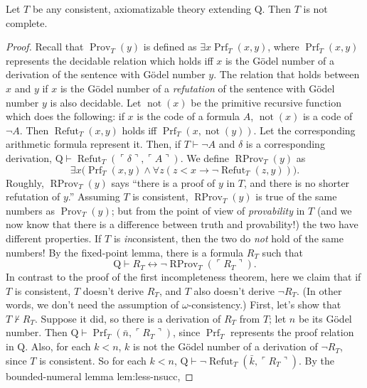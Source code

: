 \begin{theorem}
Let $T$ be any consistent, axiomatizable theory extending $\mathrm Q$. Then $T$ is not complete.
\end{theorem}
\begin{proof}
Recall that $\operatorname{Prov}_T(y)$ is defined as $\exists x\operatorname{Prf}_T(x,y)$, where $\operatorname{Prf}_T(x,y)$ represents the decidable relation which holds iff $x$ is the G\"odel number of a derivation of the sentence with G\"odel number $y$. The relation that holds between $x$ and $y$ if $x$ is the G\"odel number of a \emph{refutation} of the sentence with G\"odel number $y$ is also decidable. Let $\operatorname{not}(x)$ be the primitive recursive function which does the following: if $x$ is the code of a formula $A$, $\operatorname{not}(x)$ is a code of $\neg A$. Then $\operatorname{Refut}_T(x,y)$ holds iff $\operatorname{Prf}_T(x,\operatorname{not}(y))$. Let the corresponding arithmetic formula represent it. Then, if $T\vdash\neg A$ and $\delta$ is a corresponding derivation, $\mathrm Q\vdash\operatorname{Refut}_T(\ulcorner\delta\urcorner,\ulcorner A\urcorner)$. We define $\operatorname{RProv}_T(y)$ as
\[\exists x\bigl(\operatorname{Prf}_T(x,y)\land\forall z(z<x\to\neg\operatorname{Refut}_T(z,y))\bigr).\]
Roughly, $\operatorname{RProv}_T(y)$ says ``there is a proof of $y$ in $T$, and there is no shorter refutation of $y$.'' Assuming $T$ is consistent, $\operatorname{RProv}_T(y)$ is true of the same numbers as $\operatorname{Prov}_T(y)$; but from the point of view of \emph{provability} in $T$ (and we now know that there is a difference between truth and provability!) the two have different properties. If $T$ is \emph{in}consistent, then the two do \emph{not} hold of the same numbers!
By the fixed-point lemma, there is a formula $R_T$ such that
\begin{equation}\mathrm Q\vdash R_T\leftrightarrow\neg\operatorname{RProv}_T(\ulcorner R_T\urcorner).\label{RT}\end{equation}
In contrast to the proof of the first incompleteness theorem, here we claim that if $T$ is consistent, $T$ doesn't derive $R_T$, and $T$ also doesn't derive $\neg R_T$. (In other words, we don't need the assumption of $\omega$-consistency.)
First, let's show that $T\nvdash R_T$. Suppose it did, so there is a derivation of $R_T$ from $T$; let $n$ be its G\"odel number. Then $\mathrm Q\vdash\operatorname{Prf}_T(\bar n,\ulcorner R_T\urcorner)$, since $\operatorname{Prf}_T$ represents the proof relation in $\mathrm Q$. Also, for each $k<n$, $k$ is not the G\"odel number of a derivation of $\neg R_T$, since $T$ is consistent. So for each $k<n$, $\mathrm Q\vdash\neg\operatorname{Refut}_T(\bar k,\ulcorner R_T\urcorner)$. By the bounded-numeral lemma \textsf{lem:less-nsucc},

\end{proof}
